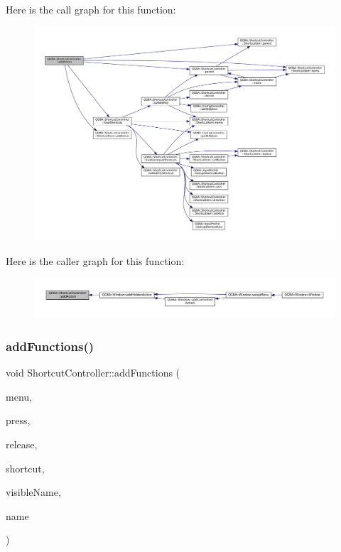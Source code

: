 Here is the call graph for this function\+:
\nopagebreak
\begin{figure}[H]
\begin{center}
\leavevmode
\includegraphics[width=350pt]{class_q_g_b_a_1_1_shortcut_controller_a55d3769ac28ea39665096105e683a834_cgraph}
\end{center}
\end{figure}
Here is the caller graph for this function\+:
\nopagebreak
\begin{figure}[H]
\begin{center}
\leavevmode
\includegraphics[width=350pt]{class_q_g_b_a_1_1_shortcut_controller_a55d3769ac28ea39665096105e683a834_icgraph}
\end{center}
\end{figure}
\mbox{\label{class_q_g_b_a_1_1_shortcut_controller_a241282f4512343d3fc9c4c1e7667181b}} 
\subsubsection{\texorpdfstring{add\+Functions()}{addFunctions()}\hspace{0.1cm}{\footnotesize\ttfamily [1/2]}}
{\footnotesize\ttfamily void Shortcut\+Controller\+::add\+Functions (\begin{DoxyParamCaption}\item[{Q\+Menu $\ast$}]{menu,  }\item[{std\+::function$<$ void()$>$}]{press,  }\item[{std\+::function$<$ void()$>$}]{release,  }\item[{\mbox{\hyperlink{ioapi_8h_a787fa3cf048117ba7123753c1e74fcd6}{int}}}]{shortcut,  }\item[{const Q\+String \&}]{visible\+Name,  }\item[{const Q\+String \&}]{name }\end{DoxyParamCaption})}

